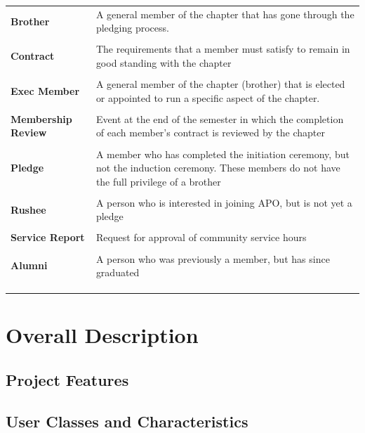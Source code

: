 \documentclass{article}
\begin{document}
\begin{longtable}{lp{8cm}}

{\bf Brother} & A general member of the chapter that has gone through
the pledging process. \\ \\
{\bf Contract} & The requirements that a member must satisfy to remain
in good standing with the chapter \\ \\
{\bf Exec Member} & A general member of the chapter (brother) that is
elected or appointed to run a specific aspect of the chapter. \\ \\
{\bf Membership Review} & Event at the end of the semester in which
the completion of each member's contract is reviewed by the chapter\\ \\
{\bf Pledge} & A member who has completed the initiation ceremony, but
not the induction ceremony. These members do not have the full
privilege of a brother\\ \\
{\bf Rushee} & A person who is interested in joining APO, but is not
yet a pledge \\ \\
{\bf Service Report} & Request for approval of community service
hours\\ \\
{\bf Alumni} & A person who was previously a member, but has since
graduated\\ \\
\\ \\

\end{longtable}

\section{Overall Description}

\subsection{Project Features}

\subsection{User Classes and Characteristics}
\end{document}
